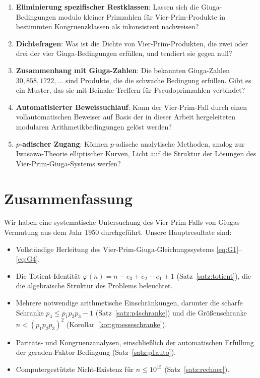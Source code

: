 \documentclass[12pt,a4paper]{amsart}
\theoremstyle{definition}
\begin{document}
\begin{enumerate}
  \item \textbf{Eliminierung spezifischer Restklassen}: Lassen sich die
        Giuga-Bedingungen modulo kleiner Primzahlen für Vier-Prim-Produkte in
        bestimmten Kongruenzklassen als inkonsistent nachweisen?
  \item \textbf{Dichtefragen}: Was ist die Dichte von Vier-Prim-Produkten,
        die zwei oder drei der vier Giuga-Bedingungen erfüllen, und tendiert
        sie gegen null?
  \item \textbf{Zusammenhang mit Giuga-Zahlen}: Die bekannten Giuga-Zahlen
        $30, 858, 1722, \ldots$ sind Produkte, die die schwache Bedingung
        erfüllen.  Gibt es ein Muster, das sie mit Beinahe-Treffern für
        Pseudoprimzahlen verbindet?
  \item \textbf{Automatisierter Beweissuchlauf}: Kann der Vier-Prim-Fall durch
        einen vollautomatischen Beweiser auf Basis der in dieser Arbeit
        hergeleiteten modularen Arithmetikbedingungen gelöst werden?
  \item \textbf{$p$-adischer Zugang}: Können $p$-adische analytische Methoden,
        analog zur Iwasawa-Theorie elliptischer Kurven, Licht auf die Struktur
        der Lösungen des Vier-Prim-Giuga-Systems werfen?
\end{enumerate}

\section{Zusammenfassung}
\label{sec:zusammenfassung}

Wir haben eine systematische Untersuchung des Vier-Prim-Falls von Giugas
Vermutung aus dem Jahr 1950 durchgeführt.  Unsere Hauptresultate sind:

\begin{itemize}
  \item Vollständige Herleitung des Vier-Prim-Giuga-Gleichungssystems
        \eqref{eq:G1}--\eqref{eq:G4}.
  \item Die Totient-Identität $\varphi(n) = n - e_3 + e_2 - e_1 + 1$
        (Satz~\ref{satz:totient}), die die algebraische Struktur des Problems
        beleuchtet.
  \item Mehrere notwendige arithmetische Einschränkungen, darunter die scharfe
        Schranke $p_4 \le p_1 p_2 p_3 - 1$ (Satz~\ref{satz:p4schranke})
        und die Größenschranke $n < (p_1 p_2 p_3)^2$
        (Korollar~\ref{kor:groesseschranke}).
  \item Paritäts- und Kongruenzanalysen, einschließlich der automatischen
        Erfüllung der geraden-Faktor-Bedingung (Satz~\ref{satz:p1auto}).
  \item Computergestützte Nicht-Existenz für $n \le 10^{15}$
        (Satz~\ref{satz:rechner}).
\end{itemize}
\end{document}

